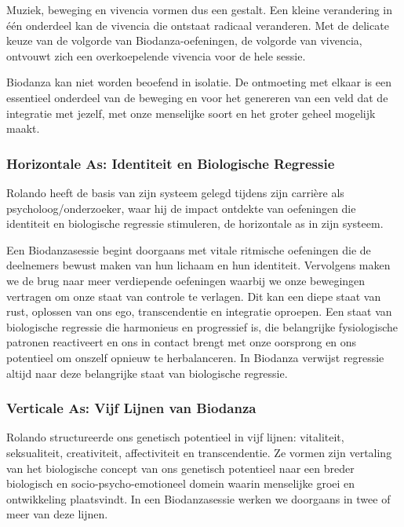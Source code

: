 \documentclass[
  11pt,
]{book}
\begin{document}
Muziek, beweging en vivencia vormen dus een gestalt. Een kleine verandering in één onderdeel kan de vivencia die ontstaat radicaal veranderen. Met de delicate keuze van de volgorde van Biodanza-oefeningen, de volgorde van vivencia, ontvouwt zich een overkoepelende vivencia voor de hele sessie.

Biodanza kan niet worden beoefend in isolatie. De ontmoeting met elkaar is een essentieel onderdeel van de beweging en voor het genereren van een veld dat de integratie met jezelf, met onze menselijke soort en het groter geheel mogelijk maakt.

\hypertarget{horizontale-as-identiteit-en-biologische-regressie}{%
\subsubsection{Horizontale As: Identiteit en Biologische Regressie}\label{horizontale-as-identiteit-en-biologische-regressie}}

Rolando heeft de basis van zijn systeem gelegd tijdens zijn carrière als psycholoog/onderzoeker, waar hij de impact ontdekte van oefeningen die identiteit en biologische regressie stimuleren, de horizontale as in zijn systeem.

Een Biodanzasessie begint doorgaans met vitale ritmische oefeningen die de deelnemers bewust maken van hun lichaam en hun identiteit. Vervolgens maken we de brug naar meer verdiepende oefeningen waarbij we onze bewegingen vertragen om onze staat van controle te verlagen. Dit kan een diepe staat van rust, oplossen van ons ego, transcendentie en integratie oproepen. Een staat van biologische regressie die harmonieus en progressief is, die belangrijke fysiologische patronen reactiveert en ons in contact brengt met onze oorsprong en ons potentieel om onszelf opnieuw te herbalanceren. In Biodanza verwijst regressie altijd naar deze belangrijke staat van biologische regressie.

\hypertarget{verticale-as-vijf-lijnen-van-biodanza}{%
\subsubsection{Verticale As: Vijf Lijnen van Biodanza}\label{verticale-as-vijf-lijnen-van-biodanza}}

Rolando structureerde ons genetisch potentieel in vijf lijnen: vitaliteit, seksualiteit, creativiteit, affectiviteit en transcendentie. Ze vormen zijn vertaling van het biologische concept van ons genetisch potentieel naar een breder biologisch en socio-psycho-emotioneel domein waarin menselijke groei en ontwikkeling plaatsvindt. In een Biodanzasessie werken we doorgaans in twee of meer van deze lijnen.
\end{document}
